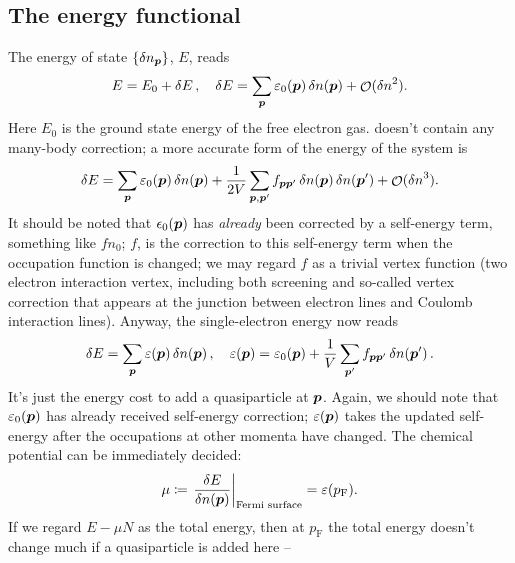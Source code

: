 \documentclass[hyperref, a4paper]{article}
\DeclareMathOperator{\bigO}{\mathcal{O}}
\newcommand*{\pfermi}{p_{\text{F}}}
\begin{document}
\subsection{The energy functional}

The energy of state $\{\var{n}_{\vb*{p}}\}$, $E$, reads 
\begin{equation}
    E = E_0 + \var{E}, \quad 
    \var{E}  = \sum_{\vb*{p}} \varepsilon_0(\vb*{p}) \var{n(\vb*{p})} + 
    \bigO(\var{n}^2).
    \label{eq:fermi-liquid.linear-energy}
\end{equation}
Here $E_0$ is the ground state energy of the free electron gas.
 doesn't contain any many-body correction; 
a more accurate form of the energy of the system is 
\begin{equation}
    \var{E} = \sum_{\vb*{p}} \varepsilon_0(\vb*{p}) \var{n(\vb*{p})}
    + \frac{1}{2 V} \sum_{\vb*{p}, \vb*{p}'}
    f_{\vb*{p} \vb*{p}'} \var{n(\vb*{p})} \var{n(\vb*{p}')} + \bigO(\var{n}^3).
\end{equation}
It should be noted that $\epsilon_0(\vb*{p})$ 
has \emph{already} been corrected by a self-energy term,
something like $f n_0$; 
$f$, is the correction to this self-energy term 
when the occupation function is changed;
we may regard $f$ as a trivial vertex function 
(two electron interaction vertex, 
including both screening and 
so-called vertex correction 
that appears at the junction between electron lines and Coulomb interaction lines).
Anyway, the single-electron energy now reads
\begin{equation}
    \var{E} = \sum_{\vb*{p}} \varepsilon(\vb*{p}) \var{n(\vb*{p})} , 
    \quad \varepsilon(\vb*{p}) = \varepsilon_0(\vb*{p}) 
    + \frac{1}{V} \sum_{\vb*{p}'} f_{\vb*{p} \vb*{p}'} \var{n(\vb*{p}')}.
    \label{eq:fermi-liquid.quasiparticle-energy}
\end{equation}
It's just the energy cost to add a quasiparticle at $\vb*{p}$.
Again, we should note that $\varepsilon_0(\vb*{p})$ has already received 
self-energy correction;
$\varepsilon(\vb*{p})$ takes the updated self-energy 
after the occupations at other momenta have changed.
The chemical potential can be immediately decided:
\begin{equation}
    \mu \coloneqq \eval{\fdv{E}{n(\vb*{p})}}_{\text{Fermi surface}} = \varepsilon(\pfermi).
    \label{eq:chemical-potential}
\end{equation}
If we regard $E - \mu N$ as the total energy, 
then at $\pfermi$ the total energy doesn't change much if a quasiparticle is added here -- 
\end{document}
